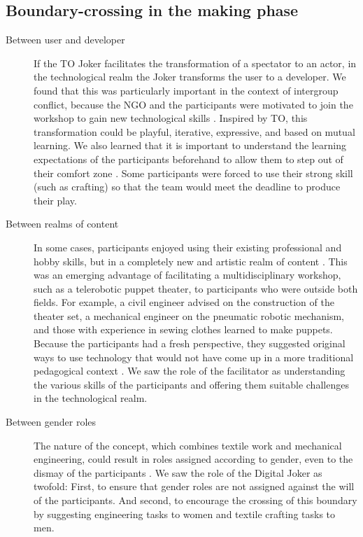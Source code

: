 \documentclass[dissertation,math,vertlayout,pdfa,colorlinks,nologo]{aaltoseries}
\begin{document}
\subsection{Boundary-crossing in the making phase}
\begin{description}
   \item[Between user and developer] If the TO Joker facilitates the transformation of a spectator to an actor, in the technological realm the Joker transforms the user to a developer. We found that this was particularly important in the context of intergroup conflict, because the NGO and the participants were motivated to join the workshop to gain new technological skills \cite[p. 19]{peledTeleroboticTheaterOppressed2025}. Inspired by TO, this transformation could be playful, iterative, expressive, and based on mutual learning. We also learned that it is important to understand the learning expectations of the participants beforehand to allow them to step out of their comfort zone \cite[p. 18]{peledTeleroboticTheaterOppressed2025}. Some participants were forced to use their strong skill (such as crafting) so that the team would meet the deadline to produce their play.
   \item[Between realms of content] In some cases, participants enjoyed using their existing professional and hobby skills, but in a completely new and artistic realm of content \cite[p. 18]{peledTeleroboticTheaterOppressed2025}. This was an emerging advantage of facilitating a multidisciplinary workshop, such as a telerobotic puppet theater, to participants who were outside both fields. For example, a civil engineer advised on the construction of the theater set, a mechanical engineer on the pneumatic robotic mechanism, and those with experience in sewing clothes learned to make puppets. Because the participants had a fresh perspective, they suggested original ways to use technology that would not have come up in a more traditional pedagogical context \cite[p. 18]{peledTeleroboticTheaterOppressed2025}. We saw the role of the facilitator as understanding the various skills of the participants and offering them suitable challenges in the technological realm.
   \item[Between gender roles] The nature of the concept, which combines textile work and mechanical engineering, could result in roles assigned according to gender, even to the dismay of the participants \cite[p. 19]{peledTeleroboticTheaterOppressed2025}. We saw the role of the Digital Joker as twofold: First, to ensure that gender roles are not assigned against the will of the participants. And second, to encourage the crossing of this boundary by suggesting engineering tasks to women and textile crafting tasks to men.

\end{description}
\end{document}
